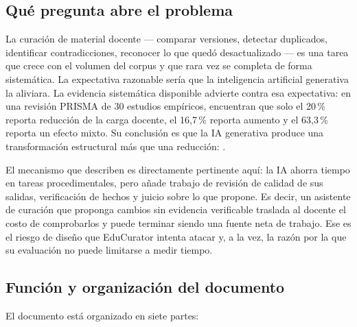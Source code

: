 \subsection{Qué pregunta abre el problema}

La curación de material docente --- comparar versiones, detectar duplicados,
identificar contradicciones, reconocer lo que quedó desactualizado --- es una tarea
que crece con el volumen del corpus y que rara vez se completa de forma sistemática.
La expectativa razonable sería que la inteligencia artificial generativa la aliviara.
La evidencia sistemática disponible advierte contra esa expectativa: en una revisión
PRISMA de 30 estudios empíricos, \textcite{su2026efficiency} encuentran que solo el
20\,\% reporta reducción de la carga docente, el 16,7\,\% reporta aumento y el
63,3\,\% reporta un efecto mixto. Su conclusión es que la IA generativa produce una
transformación estructural más que una reducción:
.

El mecanismo que describen es directamente pertinente aquí: la IA ahorra tiempo en
tareas procedimentales, pero añade trabajo de revisión de calidad de sus salidas,
verificación de hechos y juicio sobre lo que propone. Es decir, un asistente de
curación que proponga cambios sin evidencia verificable traslada al docente el costo
de comprobarlos y puede terminar siendo una fuente neta de trabajo. Ese es el riesgo
de diseño que EduCurator intenta atacar y, a la vez, la razón por la que su
evaluación no puede limitarse a medir tiempo.

\subsection{Función y organización del documento}

El documento está organizado en siete partes:

